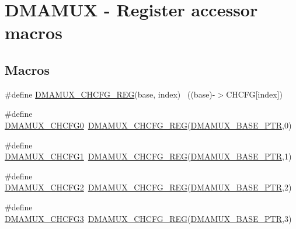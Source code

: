\hypertarget{group___d_m_a_m_u_x___register___accessor___macros}{}\section{D\+M\+A\+M\+UX -\/ Register accessor macros}
\label{group___d_m_a_m_u_x___register___accessor___macros}
\subsection*{Macros}
\begin{DoxyCompactItemize}
\item 
\#define \hyperlink{group___d_m_a_m_u_x___register___accessor___macros_ga10cf09fe06ed04dc004b7b41da7cbf0d}{D\+M\+A\+M\+U\+X\+\_\+\+C\+H\+C\+F\+G\+\_\+\+R\+EG}(base,  index)                      ~((base)-\/$>$C\+H\+C\+FG\mbox{[}index\mbox{]})
\item 
\#define \hyperlink{group___d_m_a_m_u_x___register___accessor___macros_gaf1b9c5ddea4b98f2bbe2679878579c15}{D\+M\+A\+M\+U\+X\+\_\+\+C\+H\+C\+F\+G0}~\hyperlink{group___d_m_a_m_u_x___register___accessor___macros_ga10cf09fe06ed04dc004b7b41da7cbf0d}{D\+M\+A\+M\+U\+X\+\_\+\+C\+H\+C\+F\+G\+\_\+\+R\+EG}(\hyperlink{group___d_m_a_m_u_x___peripheral_gad38c261e5de04658dbad762d40e8904e}{D\+M\+A\+M\+U\+X\+\_\+\+B\+A\+S\+E\+\_\+\+P\+TR},0)
\item 
\#define \hyperlink{group___d_m_a_m_u_x___register___accessor___macros_gade1efccfbb28dfd338600665129d4b99}{D\+M\+A\+M\+U\+X\+\_\+\+C\+H\+C\+F\+G1}~\hyperlink{group___d_m_a_m_u_x___register___accessor___macros_ga10cf09fe06ed04dc004b7b41da7cbf0d}{D\+M\+A\+M\+U\+X\+\_\+\+C\+H\+C\+F\+G\+\_\+\+R\+EG}(\hyperlink{group___d_m_a_m_u_x___peripheral_gad38c261e5de04658dbad762d40e8904e}{D\+M\+A\+M\+U\+X\+\_\+\+B\+A\+S\+E\+\_\+\+P\+TR},1)
\item 
\#define \hyperlink{group___d_m_a_m_u_x___register___accessor___macros_ga1998089c67f104540eb435c07aced432}{D\+M\+A\+M\+U\+X\+\_\+\+C\+H\+C\+F\+G2}~\hyperlink{group___d_m_a_m_u_x___register___accessor___macros_ga10cf09fe06ed04dc004b7b41da7cbf0d}{D\+M\+A\+M\+U\+X\+\_\+\+C\+H\+C\+F\+G\+\_\+\+R\+EG}(\hyperlink{group___d_m_a_m_u_x___peripheral_gad38c261e5de04658dbad762d40e8904e}{D\+M\+A\+M\+U\+X\+\_\+\+B\+A\+S\+E\+\_\+\+P\+TR},2)
\item 
\#define \hyperlink{group___d_m_a_m_u_x___register___accessor___macros_gaf6786fc146f407e226ca14ccd1574be6}{D\+M\+A\+M\+U\+X\+\_\+\+C\+H\+C\+F\+G3}~\hyperlink{group___d_m_a_m_u_x___register___accessor___macros_ga10cf09fe06ed04dc004b7b41da7cbf0d}{D\+M\+A\+M\+U\+X\+\_\+\+C\+H\+C\+F\+G\+\_\+\+R\+EG}(\hyperlink{group___d_m_a_m_u_x___peripheral_gad38c261e5de04658dbad762d40e8904e}{D\+M\+A\+M\+U\+X\+\_\+\+B\+A\+S\+E\+\_\+\+P\+TR},3)

\end{DoxyCompactItemize}
